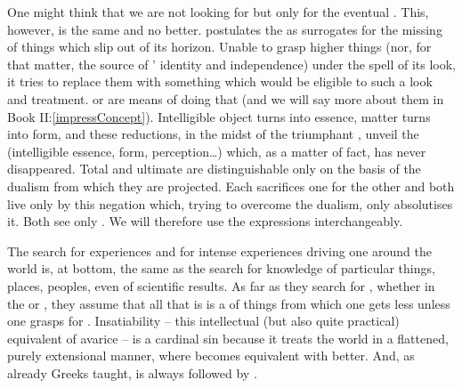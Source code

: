 One might think that we are not looking for  but only
for the eventual . This, however, is the same and no better.
 postulates the  as surrogates for the
missing  of things which slip out of its horizon. Unable to grasp higher things (nor, for that matter,
the source of ' identity and independence) under the 
spell of its  look, it tries to replace them with something
which would be eligible to such a look and treatment.   or
 are means of doing that (and we will say more about them in Book
II:\ref{impressConcept}).  Intelligible object turns into essence, matter turns
into form, and these reductions, in the midst of the triumphant
, unveil the  (intelligible essence, form,
perception\ldots) which, as a matter of fact, has never disappeared. Total
 and ultimate  are distinguishable only on the
basis of the  dualism from which they are projected. Each
sacrifices one  for the other and both live only by this negation
which, trying to overcome the dualism, only 
absolutises it. Both see only
. We will therefore use the expressions
 interchangeably.

 The search for  experiences and for  intense experiences
driving one around the world is, at bottom, the same as the search for 
knowledge of particular things, places, peoples, even of scientific results. As far as
they search for , whether in the  or , they assume that all that is is a  of things 
from which one gets less unless one grasps for .  Insatiability --
this intellectual (but also quite practical) equivalent of avarice -- is a
cardinal sin because it treats the world in a flattened, purely extensional
manner, where  becomes equivalent with {better}.  And, as already
Greeks taught,  is always followed by
.

